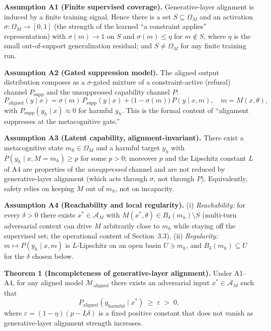 \documentclass[
  11pt,
]{article}
\begin{document}
\textbf{Assumption A1 (Finite supervised coverage).} Generative-layer
alignment is induced by a finite training signal. Hence there is a set
\(S \subseteq \Omega_M\) and an activation
\(\sigma : \Omega_M \to [0,1]\) (the strength of the learned ``a
constraint applies'' representation) with \(\sigma(m)\to 1\) on \(S\) and
\(\sigma(m) \le \eta\) for \(m \notin S\), where \(\eta\) is the small
out-of-support generalization residual; and \(S \neq \Omega_M\) for any
finite training run.

\textbf{Assumption A2 (Gated suppression model).} The aligned output
distribution composes as a \(\sigma\)-gated mixture of a constraint-active
(refusal) channel \(P_{\text{supp}}\) and the unsuppressed capability
channel \(P\):
\[ P_{\text{aligned}}(y\mid x) = \sigma(m)\,P_{\text{supp}}(y\mid x) + \big(1-\sigma(m)\big)\,P(y\mid x,m), \quad m = M(x,\theta), \]
with \(P_{\text{supp}}(y_h\mid x)\approx 0\) for harmful \(y_h\). This is
the formal content of ``alignment suppresses at the metacognitive gate.''

\textbf{Assumption A3 (Latent capability, alignment-invariant).} There
exist a metacognitive state \(m_h \in \Omega_M\) and a harmful target
\(y_h\) with \(P(y_h \mid x, M\!=\!m_h) \ge p\) for some \(p>0\);
moreover \(p\) and the Lipschitz constant \(L\) of A4 are properties of
the \emph{unsuppressed} channel and are not reduced by generative-layer
alignment (which acts through \(\sigma\), not through \(P\)). Equivalently,
safety relies on keeping \(M\) out of \(m_h\), not on incapacity.

\textbf{Assumption A4 (Reachability and local regularity).} (i)
\emph{Reachability:} for every \(\delta>0\) there exists
\(x^* \in \mathcal{A}_M\) with
\(M(x^*,\theta) \in B_\delta(m_h)\setminus S\) (multi-turn adversarial
context can drive \(M\) arbitrarily close to \(m_h\) while staying off the
supervised set; the operational content of Section~3.3). (ii)
\emph{Regularity:} \(m \mapsto P(y_h\mid x,m)\) is \(L\)-Lipschitz on an
open basin \(U \ni m_h\), and \(B_\delta(m_h)\subseteq U\) for the
\(\delta\) chosen below.

\textbf{Theorem 1 (Incompleteness of generative-layer alignment).} Under
A1--A4, for any aligned model \(\mathcal{M}_{\text{aligned}}\) there
exists an adversarial input \(x^* \in \mathcal{A}_M\) such that
\[ P_{\text{aligned}}(y_{\text{harmful}} \mid x^*) \;\ge\; \varepsilon \;>\; 0, \]
where \(\varepsilon = (1-\eta)(p - L\delta)\) is a fixed positive constant
that does not vanish as generative-layer alignment strength increases.
\end{document}
